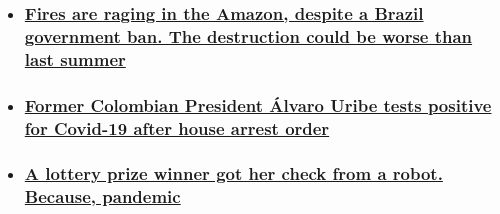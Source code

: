 \begin{itemize}
\item
  \hypertarget{fires-are-raging-in-the-amazon-despite-a-brazil-government-ban-the-destruction-could-be-worse-than-last-summer}{%
  \subsubsection{\texorpdfstring{\href{/2020/08/07/americas/brazil-bolsonaro-amazon-fires-intl/index.html}{Fires
  are raging in the Amazon, despite a Brazil government ban. The
  destruction could be worse than last
  summer}}{Fires are raging in the Amazon, despite a Brazil government ban. The destruction could be worse than last summer}}\label{fires-are-raging-in-the-amazon-despite-a-brazil-government-ban-the-destruction-could-be-worse-than-last-summer}}
\item
  \hypertarget{former-colombian-president-uxe1lvaro-uribe-tests-positive-for-covid-19-after-house-arrest-order}{%
  \subsubsection{\texorpdfstring{\href{/2020/08/05/americas/colombia-uribe-detention-intl/index.html}{Former
  Colombian President Álvaro Uribe tests positive for Covid-19 after
  house arrest
  order}}{Former Colombian President Álvaro Uribe tests positive for Covid-19 after house arrest order}}\label{former-colombian-president-uxe1lvaro-uribe-tests-positive-for-covid-19-after-house-arrest-order}}
\item
  \hypertarget{a-lottery-prize-winner-got-her-check-from-a-robot-because-pandemic}{%
  \subsubsection{\texorpdfstring{\href{/2020/08/05/americas/canadian-lotto-winner-gets-check-from-robot-trnd/index.html}{A
  lottery prize winner got her check from a robot. Because,
  pandemic}}{A lottery prize winner got her check from a robot. Because, pandemic}}\label{a-lottery-prize-winner-got-her-check-from-a-robot-because-pandemic}}
\end{itemize}

